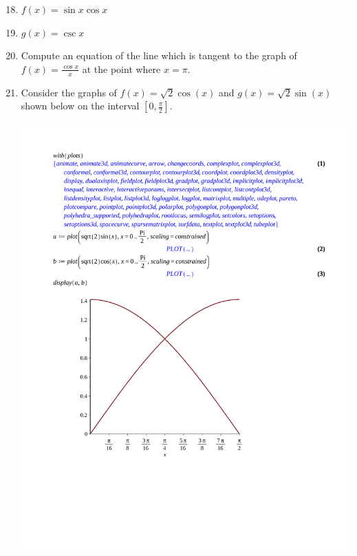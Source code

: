 \documentclass[12pt]{article}
\newif\ifans
\begin{document}
\newpage


\begin{enumerate}
\setcounter{enumi}{17}

\item $f(x) = \sin{x}\cos{x}$ 

\ifans{\fbox{$\frac{\pi}{4}, \frac{3\pi}{4}, \frac{5\pi}{4}, \frac{7\pi}{4}$}} \fi

\item $g(x) = \csc{x}$ 

\ifans{\fbox{$\frac{\pi}{2}, \frac{3\pi}{2}$}} \fi

\item Compute an equation of the line which is tangent to the graph of $f(x)=\frac{\cos{x}}{x}$ at the point where $x=\pi$.

\ifans{\fbox{$y=\frac{1}{\pi^2}x-\frac{2}{\pi}$}} \fi

\item Consider the graphs of $f(x)=\sqrt{2}\cos(x)$ and $g(x)=\sqrt{2}\sin(x)$ shown below on the interval $\left[0,\frac{\pi}{2}\right]$.

\begin{center}
\includegraphics[scale=0.4]{graph.pdf}
\end{center}


\end{enumerate}
\end{document}
